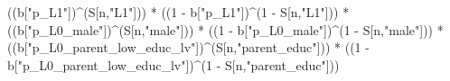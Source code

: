 \documentclass[
]{book}
\newenvironment{Shaded}{\begin{snugshade}}{\end{snugshade}}
\newcommand{\DecValTok}[1]{\textcolor[rgb]{0.00,0.00,0.81}{#1}}
\newcommand{\NormalTok}[1]{#1}
\newcommand{\SpecialCharTok}[1]{\textcolor[rgb]{0.00,0.00,0.00}{#1}}
\newcommand{\StringTok}[1]{\textcolor[rgb]{0.31,0.60,0.02}{#1}}
\begin{document}
\begin{Shaded}
\begin{Highlighting}[]
\NormalTok{      ((b[}\StringTok{"p\_L1"}\NormalTok{])}\SpecialCharTok{\^{}}\NormalTok{(S[n,}\StringTok{"L1"}\NormalTok{])) }\SpecialCharTok{*}
\NormalTok{      ((}\DecValTok{1} \SpecialCharTok{{-}}\NormalTok{ b[}\StringTok{"p\_L1"}\NormalTok{])}\SpecialCharTok{\^{}}\NormalTok{(}\DecValTok{1} \SpecialCharTok{{-}}\NormalTok{ S[n,}\StringTok{"L1"}\NormalTok{])) }\SpecialCharTok{*}
\NormalTok{      ((b[}\StringTok{"p\_L0\_male"}\NormalTok{])}\SpecialCharTok{\^{}}\NormalTok{(S[n,}\StringTok{"male"}\NormalTok{])) }\SpecialCharTok{*} 
\NormalTok{      ((}\DecValTok{1} \SpecialCharTok{{-}}\NormalTok{ b[}\StringTok{"p\_L0\_male"}\NormalTok{])}\SpecialCharTok{\^{}}\NormalTok{(}\DecValTok{1} \SpecialCharTok{{-}}\NormalTok{ S[n,}\StringTok{"male"}\NormalTok{])) }\SpecialCharTok{*} 
\NormalTok{      ((b[}\StringTok{"p\_L0\_parent\_low\_educ\_lv"}\NormalTok{])}\SpecialCharTok{\^{}}\NormalTok{(S[n,}\StringTok{"parent\_educ"}\NormalTok{])) }\SpecialCharTok{*}
\NormalTok{      ((}\DecValTok{1} \SpecialCharTok{{-}}\NormalTok{ b[}\StringTok{"p\_L0\_parent\_low\_educ\_lv"}\NormalTok{])}\SpecialCharTok{\^{}}\NormalTok{(}\DecValTok{1} \SpecialCharTok{{-}}\NormalTok{ S[n,}\StringTok{"parent\_educ"}\NormalTok{])) }
    

\end{Highlighting}
\end{Shaded}
\end{document}
